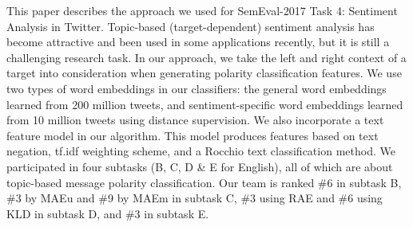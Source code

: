 This paper describes the approach we used for SemEval-2017 Task 4: Sentiment Analysis in Twitter. Topic-based (target-dependent) sentiment analysis has become attractive and been used in some applications recently, but it is still a challenging research task. In our approach, we take the left and right context of a target into consideration when generating polarity classification features.  We use two types of word embeddings in our classifiers: the general word embeddings learned from 200 million tweets, and sentiment-specific word embeddings learned from 10 million tweets using distance supervision.  We also incorporate a text feature model in our algorithm. This model produces features based on text negation, tf.idf weighting scheme, and a Rocchio text classification method. We participated in four subtasks (B, C, D \& E for English), all of which are about topic-based message polarity classification. Our team is ranked \#6 in subtask B, \#3 by MAEu and \#9 by MAEm in subtask C, \#3 using RAE and \#6 using KLD in subtask D, and \#3 in subtask E.
